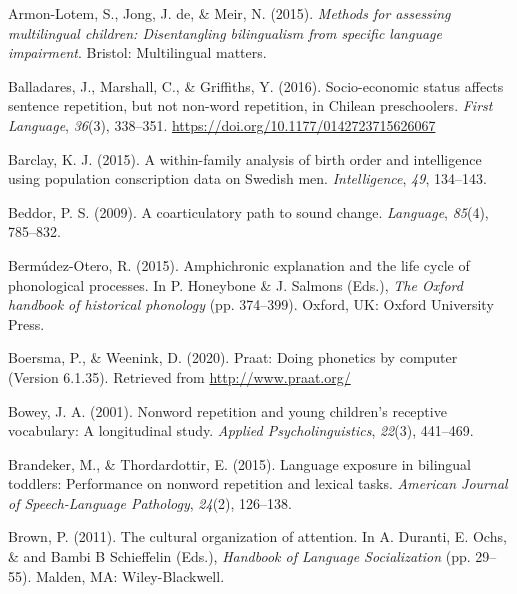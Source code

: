 \documentclass[
  american,
  ,man,floatsintext]{apa6}
\newlength{\cslhangindent}
\newlength{\cslentryspacingunit} %
\newenvironment{CSLReferences}[2] %
 {%
  \setlength{\parindent}{0pt}
  \ifodd #1
  \let\oldpar\par
  \def\par{\hangindent=\cslhangindent\oldpar}
  \fi
  \setlength{\parskip}{#2\cslentryspacingunit}
 }%
 {}
\begin{document}
\hypertarget{refs}{}
\begin{CSLReferences}{1}{0}
\leavevmode{}%
Armon-Lotem, S., Jong, J. de, \& Meir, N. (2015). \emph{Methods for assessing multilingual children: Disentangling bilingualism from specific language impairment}. Bristol: Multilingual matters.

\leavevmode{}%
Balladares, J., Marshall, C., \& Griffiths, Y. (2016). {Socio-economic status affects sentence repetition, but not non-word repetition, in Chilean preschoolers}. \emph{{First Language}}, \emph{36}(3), 338--351. \url{https://doi.org/10.1177/0142723715626067}

\leavevmode{}%
Barclay, K. J. (2015). A within-family analysis of birth order and intelligence using population conscription data on {S}wedish men. \emph{Intelligence}, \emph{49}, 134--143.

\leavevmode{}%
Beddor, P. S. (2009). A coarticulatory path to sound change. \emph{Language}, \emph{85}(4), 785--832.

\leavevmode{}%
Bermúdez-Otero, R. (2015). Amphichronic explanation and the life cycle of phonological processes. In P. Honeybone \& J. Salmons (Eds.), \emph{The {O}xford handbook of historical phonology} (pp. 374--399). Oxford, UK: Oxford University Press.

\leavevmode{}%
Boersma, P., \& Weenink, D. (2020). Praat: Doing phonetics by computer (Version 6.1.35). Retrieved from \url{http://www.praat.org/}

\leavevmode{}%
Bowey, J. A. (2001). Nonword repetition and young children's receptive vocabulary: A longitudinal study. \emph{Applied Psycholinguistics}, \emph{22}(3), 441--469.

\leavevmode{}%
Brandeker, M., \& Thordardottir, E. (2015). Language exposure in bilingual toddlers: Performance on nonword repetition and lexical tasks. \emph{American Journal of Speech-Language Pathology}, \emph{24}(2), 126--138.

\leavevmode{}%
Brown, P. (2011). The cultural organization of attention. In A. Duranti, E. Ochs, \& and Bambi B Schieffelin (Eds.), \emph{Handbook of {Language Socialization}} (pp. 29--55). Malden, MA: Wiley-Blackwell.


\end{CSLReferences}
\end{document}
